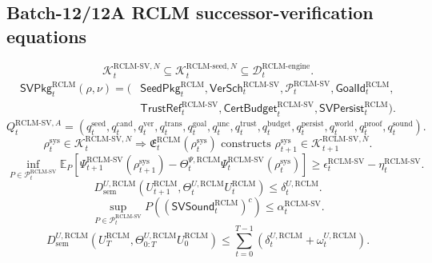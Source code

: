 \documentclass[11pt,a4paper]{article}
\newcommand{\Pcal}{\mathcal P}
\newcommand{\Kcal}{\mathcal K}
\newcommand{\Dcal}{\mathcal D}
\newcommand{\RCLM}{\mathrm{RCLM}}
\newcommand{\sem}{\mathrm{sem}}
\newcommand{\sys}{\mathrm{sys}}
\newcommand{\engine}{\mathrm{engine}}
\begin{document}
\subsection*{Batch-12/12A RCLM successor-verification equations}
\[
\Kcal_t^{\RCLM\text{-}\mathrm{SV},N}
\subseteq
\Kcal_t^{\RCLM\text{-}\mathrm{seed},N}
\subseteq
\Dcal_t^{\RCLM\text{-}\engine}.
\]
\[
\begin{aligned}
\mathsf{SVPkg}_t^{\RCLM}(\rho,\nu)
=(&\mathsf{SeedPkg}_t^{\RCLM},
\mathsf{VerSch}_t^{\RCLM\text{-}\mathrm{SV}},
\Pcal_t^{\RCLM\text{-}\mathrm{SV}},
\mathsf{GoalId}_t^{\RCLM},\\
&\mathsf{TrustRef}_t^{\RCLM\text{-}\mathrm{SV}},
\mathsf{CertBudget}_t^{\RCLM\text{-}\mathrm{SV}},
\mathsf{SVPersist}_t^{\RCLM}).
\end{aligned}
\]
\[
Q_t^{\RCLM\text{-}\mathrm{SV},A}
=(q_t^{\mathrm{seed}},q_t^{\mathrm{cand}},q_t^{\mathrm{ver}},q_t^{\mathrm{trans}},q_t^{\mathrm{goal}},q_t^{\mathrm{unc}},q_t^{\mathrm{trust}},q_t^{\mathrm{budget}},q_t^{\mathrm{persist}},q_t^{\mathrm{world}},q_t^{\mathrm{proof}},q_t^{\mathrm{sound}}).
\]
\[
\rho_t^{\sys}\in\Kcal_t^{\RCLM\text{-}\mathrm{SV},N}
\Longrightarrow
\mathfrak E_t^{\RCLM}(\rho_t^{\sys})
\text{ constructs }
\rho_{t+1}^{\sys}\in\Kcal_{t+1}^{\RCLM\text{-}\mathrm{SV},N}.
\]
\[
\inf_{P\in\Pcal_t^{\RCLM\text{-}\mathrm{SV}}}
\mathbb E_P[\Psi_{t+1}^{\RCLM\text{-}\mathrm{SV}}(\rho_{t+1}^{\sys})-
\Theta_t^{\Psi,\RCLM}\Psi_t^{\RCLM\text{-}\mathrm{SV}}(\rho_t^{\sys})]
\ge
\epsilon_t^{\RCLM\text{-}\mathrm{SV}}-
\eta_t^{\RCLM\text{-}\mathrm{SV}}.
\]
\[
D_{\sem}^{U,\RCLM}(U_{t+1}^{\RCLM},\Theta_t^{U,\RCLM}U_t^{\RCLM})
\le
\delta_t^{U,\RCLM}.
\]
\[
\sup_{P\in\Pcal_t^{\RCLM\text{-}\mathrm{SV}}}P((\mathsf{SVSound}_t^{\RCLM})^c)
\le
\alpha_t^{\RCLM\text{-}\mathrm{SV}}.
\]
\[
D_{\sem}^{U,\RCLM}(U_T^{\RCLM},\Theta_{0:T}^{U,\RCLM}U_0^{\RCLM})
\le
\sum_{t=0}^{T-1}(\delta_t^{U,\RCLM}+\omega_t^{U,\RCLM}).
\]
\end{document}
